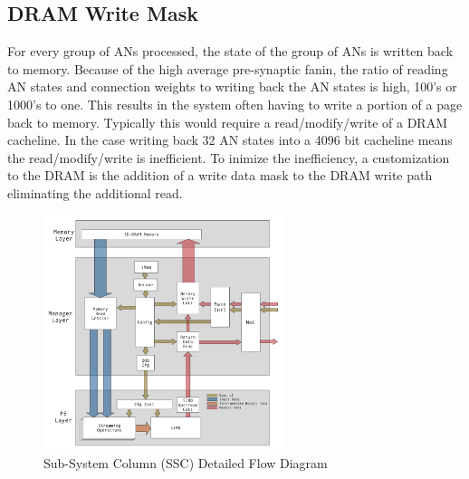 \documentclass[journal]{IEEEtran}
\begin{document}
\subsection{DRAM Write Mask}
\label{sec:dramWriteMask}

For every group of ANs processed, the state of the group of ANs is written back to memory.
Because of the high average pre-synaptic fanin, the ratio of reading AN states and connection weights to writing back the AN states is high, 100's or 1000's to one. 
This results in the system often having to write a portion of a page back to memory. 
Typically this would require a read/modify/write of a DRAM cacheline. In the case writing back 32 AN states into a 4096 bit cacheline means the read/modify/write is inefficient.
To inimize the inefficiency, a customization to the DRAM is the addition of a write data mask to the DRAM write path eliminating the additional read.


%
%
\iftrue

\begin{figure}[!t]
\centering
\captionsetup{justification=centering}
\captionsetup{width=.9\linewidth}
\centerline{
\mbox{\includegraphics[width=2.75in]{DetailedFlowDiagram.jpg}}
}
\center\caption{Sub-System Column (SSC) Detailed Flow Diagram}
\label{fig:DetailedFlowDiagram}
\end{figure}
\end{document}
